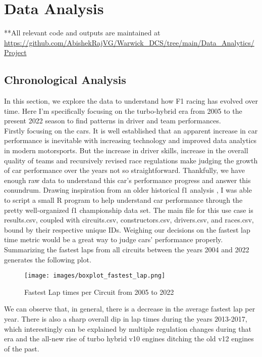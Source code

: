 \documentclass[10pt,twocolumn,letterpaper]{article}
\begin{document}
\section{Data Analysis}
**All relevant code and outputs are maintained at \url{https://github.com/AbishekRajVG/Warwick_DCS/tree/main/Data_Analytics/Project}

\subsection{Chronological Analysis}
In this section, we explore the data to understand how F1 racing has evolved over time. Here I'm specifically focusing on the turbo-hybrid era from 2005 to the present 2022 season to find patterns in driver and team performances. \\

Firstly focusing on the cars. It is well established that an apparent increase in car performance is inevitable with increasing technology and improved data analytics in modern motorsports. But the increase in driver skills, increase in the overall quality of teams and recursively revised race regulations make judging the growth of car performance over the years not so straightforward. Thankfully, we have enough raw data to understand this car's performance progress and answer this conundrum. Drawing inspiration from an older historical f1 analysis \cite{kaggle_5y_f1}, I was able to script a small R program to help understand car performance through the pretty well-organized f1 championship data set. The main file for this use case is results.csv, coupled with circuits.csv, constructors.csv, drivers.csv, and races.csv, bound by their respective unique IDs. Weighing our decisions on the fastest lap time metric would be a great way to judge cars' performance properly. Summarizing the fastest laps from all circuits between the years 2004 and 2022 generates the following plot.

\begin{figure}[h]
\centering
\texttt{[image: images/boxplot\_fastest\_lap.png]} 
\caption{Fastest Lap times per Circuit from 2005 to 2022}
\end{figure}

We can observe that, in general, there is a decrease in the average fastest lap per year. There is also a sharp overall dip in lap times during the years 2013-2017, which interestingly can be explained by multiple regulation changes \cite{wiki_f1_regulations} during that era and the all-new rise of turbo hybrid v10 engines ditching the old v12 engines of the past. \cite{wiki_f1_engines} \\
\end{document}

